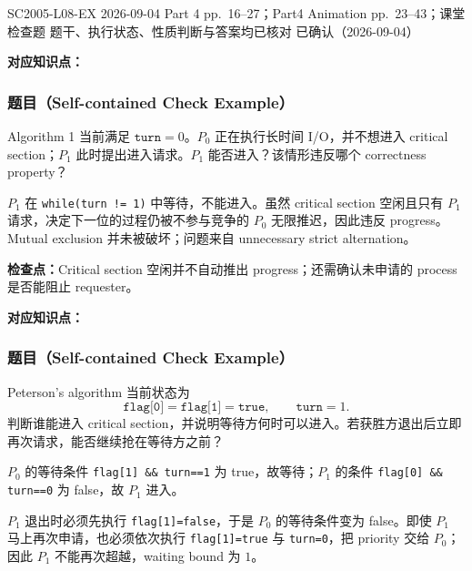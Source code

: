 

\examplemeta
  {SC2005-L08-EX}
  {2026-09-04}
  {Part 4 pp.~16--27；Part4 Animation pp.~23--43；课堂检查题}
  {题干、执行状态、性质判断与答案均已核对}
  {已确认（2026-09-04）}


\textbf{对应知识点：}

\subsubsection*{题目（Self-contained Check Example）}

Algorithm 1 当前满足 $\texttt{turn}=0$。$P_0$ 正在执行长时间 I/O，并不想进入 critical section；$P_1$ 此时提出进入请求。$P_1$ 能否进入？该情形违反哪个 correctness property？

\begin{checkedsolution}
$P_1$ 在 \texttt{while(turn != 1)} 中等待，不能进入。虽然 critical section 空闲且只有 $P_1$ 请求，决定下一位的过程仍被不参与竞争的 $P_0$ 无限推迟，因此违反 progress。Mutual exclusion 并未被破坏；问题来自 unnecessary strict alternation。
\end{checkedsolution}

\textbf{检查点：}Critical section 空闲并不自动推出 progress；还需确认未申请的 process 是否能阻止 requester。


\textbf{对应知识点：}

\subsubsection*{题目（Self-contained Check Example）}

Peterson's algorithm 当前状态为
\[
  \texttt{flag[0]}=\texttt{flag[1]}=\texttt{true},\qquad \texttt{turn}=1.
\]
判断谁能进入 critical section，并说明等待方何时可以进入。若获胜方退出后立即再次请求，能否继续抢在等待方之前？

\begin{checkedsolution}
$P_0$ 的等待条件 \texttt{flag[1] \&\& turn==1} 为 true，故等待；$P_1$ 的条件 \texttt{flag[0] \&\& turn==0} 为 false，故 $P_1$ 进入。

$P_1$ 退出时必须先执行 \texttt{flag[1]=false}，于是 $P_0$ 的等待条件变为 false。即使 $P_1$ 马上再次申请，也必须依次执行 \texttt{flag[1]=true} 与 \texttt{turn=0}，把 priority 交给 $P_0$；因此 $P_1$ 不能再次超越，waiting bound 为 $1$。
\end{checkedsolution}

